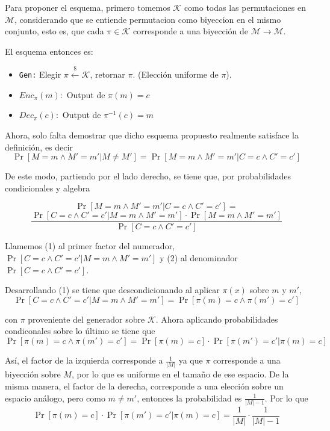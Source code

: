 \documentclass[twoside]{tareas}
\begin{document}
\begin{enumerate}
    Para proponer el esquema, primero tomemos $\mathcal{K}$ como todas las permutaciones en $\mathcal{M}$, considerando que se entiende permutacion como biyeccion en el mismo conjunto, esto es, que cada $\pi \in \mathcal{K}$ corresponde a una biyección de $\mathcal{M} \rightarrow \mathcal{M}$.

    El esquema entonces es:
    \begin{itemize}
        \item \texttt{Gen:} Elegir $\pi \stackrel{\$}{\leftarrow} \mathcal{K}$, retornar $\pi$. (Elección uniforme de $\pi$).
        \item \texttt{$Enc_{\pi}(m):$} Output de $\pi(m) = c$
        \item \texttt{$Dec_{\pi}(c):$} Output de $\pi^{-1}(c) = m$
    \end{itemize}

    Ahora, solo falta demostrar que dicho esquema propuesto realmente satisface la definición, es decir
    $$\Pr[M=m \wedge M'=m' | M \neq M'] = \Pr[M=m \wedge M'=m' | C=c \wedge C'=c']$$

    De este modo, partiendo por el lado derecho, se tiene que, por probabilidades condicionales y algebra

    $$\Pr[M=m \wedge M'=m' | C=c \wedge C'=c'] = $$ $$\frac{\Pr[C=c \wedge C'=c' | M=m \wedge M'=m'] \cdot \Pr[M=m \wedge M'=m']}{\Pr[C=c \wedge C'=c']}$$

    Llamemos (1) al primer factor del numerador, $\Pr[C=c \wedge C'=c' | M=m \wedge M'=m']$ y (2) al denominador $\Pr[C=c \wedge C'=c']$.

    Desarrollando (1) se tiene que descondicionando al aplicar $\pi(x)$ sobre $m$ y $m'$,
    $$\Pr[C=c \wedge C'=c' | M=m \wedge M'=m'] = \Pr[\pi(m)=c \wedge \pi(m')=c']$$

    con $\pi$ proveniente del generador sobre $\mathcal{K}$. Ahora aplicando probabilidades condiconales sobre lo último se tiene que
    $$\Pr[\pi(m)=c \wedge \pi(m')=c'] = \Pr[\pi(m)=c] \cdot \Pr[\pi(m')=c' | \pi(m) = c]$$

    Así, el factor de la izquierda corresponde a $\frac{1}{|M|}$ ya que $\pi$ corresponde a una biyección sobre $M$, por lo que es uniforme en el tamaño de ese espacio. De la misma manera, el factor de la derecha, corresponde a una elección sobre un espacio análogo, pero como $m \neq m'$, entonces la probabilidad es $\frac{1}{|M| - 1}$. Por lo que
    $$\Pr[\pi(m)=c] \cdot \Pr[\pi(m')=c' | \pi(m) = c] = \frac{1}{|M|} \cdot \frac{1}{|M| - 1}$$


\end{enumerate}
\end{document}
